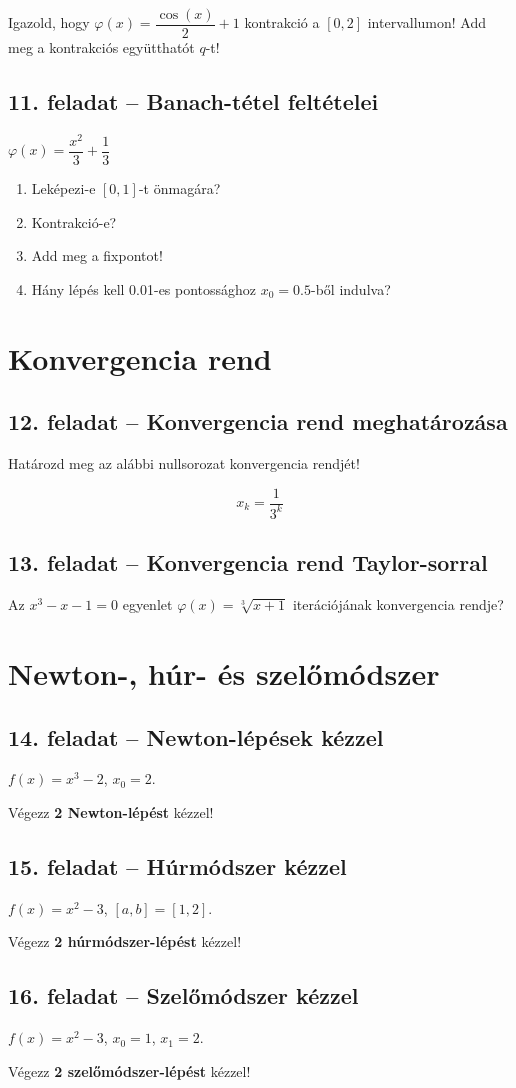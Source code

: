 \documentclass[a4paper,12pt]{article}
\begin{document}
Igazold, hogy $\varphi(x) = \dfrac{\cos(x)}{2} + 1$ kontrakció a $[0, 2]$ intervallumon!
Add meg a kontrakciós együtthatót $q$-t!


\subsection*{11. feladat -- Banach-tétel feltételei}

$\varphi(x) = \dfrac{x^2}{3} + \dfrac{1}{3}$

\begin{enumerate}[noitemsep,topsep=2pt]
  \item Leképezi-e $[0,1]$-t önmagára?
  \item Kontrakció-e?
  \item Add meg a fixpontot!
  \item Hány lépés kell 0.01-es pontossághoz $x_0 = 0.5$-ből indulva?
\end{enumerate}


\section{Konvergencia rend}
\subsection*{12. feladat -- Konvergencia rend meghatározása}

Határozd meg az alábbi nullsorozat konvergencia rendjét!

$$x_k = \frac{1}{3^k}$$


\subsection*{13. feladat -- Konvergencia rend Taylor-sorral}

Az $x^3-x-1=0$ egyenlet $\varphi(x)=\sqrt[3]{x+1}$ iterációjának konvergencia rendje?


\section{Newton-, húr- és szelőmódszer}
\subsection*{14. feladat -- Newton-lépések kézzel}

$f(x) = x^3 - 2$, $x_0 = 2$.

Végezz \textbf{2 Newton-lépést} kézzel!


\subsection*{15. feladat -- Húrmódszer kézzel}

$f(x) = x^2 - 3$, $[a,b]=[1,2]$.

Végezz \textbf{2 húrmódszer-lépést} kézzel!


\subsection*{16. feladat -- Szelőmódszer kézzel}

$f(x) = x^2 - 3$, $x_0=1$, $x_1=2$.

Végezz \textbf{2 szelőmódszer-lépést} kézzel!
\end{document}
